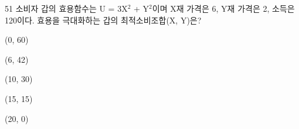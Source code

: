 \begin{question}{51}
소비자 갑의 효용함수는 U = 3X$^2$ + Y$^2$이며 X재 가격은 6, Y재 가격은 2, 소득은 120이다. 효용을 극대화하는 갑의 최적소비조합(X, Y)은?
\begin{choices}
  \item (0, 60)
  \item (6, 42)
  \item (10, 30)
  \item (15, 15)
  \item (20, 0)
\end{choices}
\end{question}

